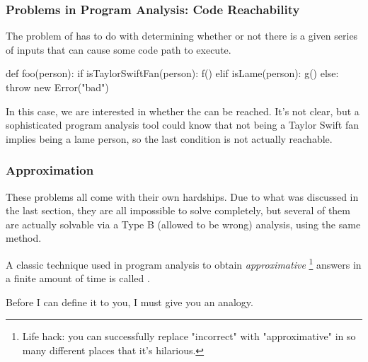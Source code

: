 \documentclass[aspectratio=169, handout]{beamer}
\begin{document}
 \begin{frame}[fragile]
   \frametitle{Problems in Program Analysis: Code Reachability}

   The problem of  has to do with determining whether or
   not there is a given series of inputs that can cause some code path to execute.

   \pause
   \vspace{\fill}

   \begin{codeblock}[language=python]
    def foo(person):
      if isTaylorSwiftFan(person):
        f()
      elif isLame(person):
        g()
      else:
        throw new Error("bad")
   \end{codeblock}

   \pause
   \vspace{\fill}

   In this case, we are interested in whether the  can be reached.
   It's not clear, but a sophisticated program analysis tool could know that not
   being a Taylor Swift fan implies being a lame person, so the last condition is
   not actually reachable.
 \end{frame}

 \begin{frame}[fragile]
   \frametitle{Approximation}

   These problems all come with their own hardships. Due to what was discussed
   in the last section, they are all impossible to solve completely, but several
   of them are actually solvable via a Type B (allowed to be wrong) analysis,
   using the same method.

   \pause
   \vspace{\fill}

   A classic technique used in program analysis to obtain \textit{approximative}
   \footnote{Life hack: you can successfully replace "incorrect" with
   "approximative" in so many different places that it's hilarious.} answers
   in a finite amount of time is called .

   \pause
   \vspace{\fill}

   Before I can define it to you, I must give you an analogy.

 \end{frame}
\end{document}
